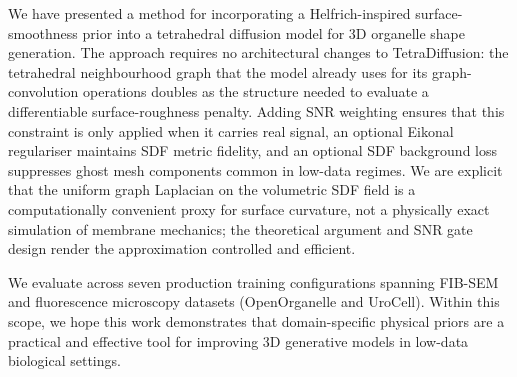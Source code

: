 \documentclass[10pt, a4paper, twocolumn]{article}
\begin{document}
We have presented a method for incorporating a Helfrich-inspired surface-smoothness prior into a tetrahedral diffusion model for 3D organelle shape generation. The approach requires no architectural changes to TetraDiffusion: the tetrahedral neighbourhood graph that the model already uses for its graph-convolution operations doubles as the structure needed to evaluate a differentiable surface-roughness penalty. Adding SNR weighting ensures that this constraint is only applied when it carries real signal, an optional Eikonal regulariser maintains SDF metric fidelity, and an optional SDF background loss suppresses ghost mesh components common in low-data regimes. We are explicit that the uniform graph Laplacian on the volumetric SDF field is a computationally convenient proxy for surface curvature, not a physically exact simulation of membrane mechanics; the theoretical argument and SNR gate design render the approximation controlled and efficient.

We evaluate across seven production training configurations spanning FIB-SEM and fluorescence microscopy datasets (OpenOrganelle and UroCell). Within this scope, we hope this work demonstrates that domain-specific physical priors are a practical and effective tool for improving 3D generative models in low-data biological settings.



\end{document}
